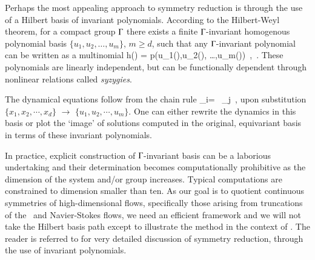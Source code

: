 Perhaps the most appealing approach to symmetry reduction is
through the use of a Hilbert basis of invariant polynomials.
According to the Hilbert-Weyl theorem, 
for a compact group $\Gamma$ there exists a finite
$\Gamma${-invariant} homogenous polynomial basis
$\{u_1,u_2, \dots,u_m\}$, $ m \geq d$,
such that any $\Gamma${-invariant} polynomial
can be written as a multinomial
\beq
h(\ssp) = p(u_1(\ssp),u_2(\ssp), \dots,u_m(\ssp))
    \,,\qquad \ssp \in \pS
\,.
These polynomials are linearly
independent, but can be functionally dependent through
nonlinear relations called \emph{syzygies}.

The dynamical
equations follow from the chain rule
\beq
 _i= \, _j
 \,,
upon substitution
$\{x_1,x_2,\cdots,x_d\}$ $\to$ $\{u_1,u_2,\cdots,u_m\}$.
One can either rewrite the dynamics in this basis or
plot the `image' of solutions computed in the original, equivariant
basis in terms of these invariant polynomials.


In practice, explicit construction of $\Gamma${-invariant} basis
can be a laborious undertaking and their determination becomes 
computationally prohibitive as the dimension of the system and/or group
increases. Typical
computations are constrained to dimension smaller than ten.
As our goal is to quotient continuous symmetries of
high-dimensional flows, specifically those arising from
truncations of the \KS\ and Navier-Stokes flows, 
we need an efficient framework and we will not take the Hilbert basis 
path except to illustrate the method in the context of \cLe.
The reader is referred to 
for very detailed discussion of symmetry reduction, through
the use of invariant polynomials.
